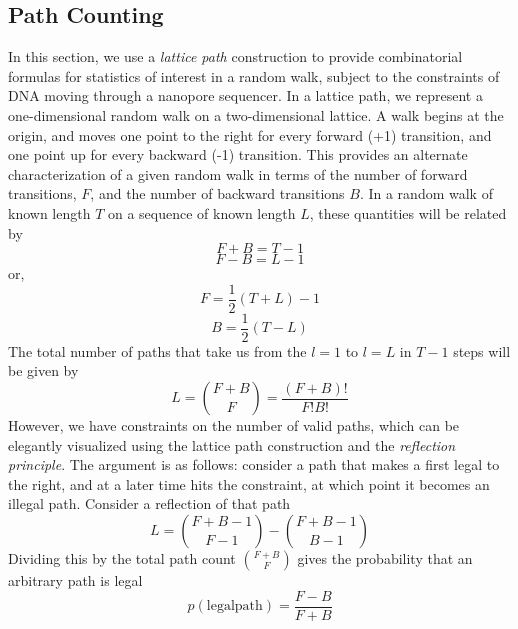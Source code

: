 \subsection{Path Counting}
In this section, we use a \emph{lattice path} construction to provide combinatorial formulas for statistics of interest in a random walk, subject to the constraints of DNA moving through a nanopore sequencer. In a lattice path, we represent a one-dimensional random walk on a two-dimensional lattice. A walk begins at the origin, and moves one point to the right for every forward (+1) transition, and one point up for every backward (-1) transition. This provides an alternate characterization of a given random walk in terms of the number of forward transitions, $F$, and the number of backward transitions $B$. In a random walk of known length $T$ on a sequence of known length $L$, these quantities will be related by
\begin{equation}
F+B = T-1
\end{equation}
\begin{equation}
F-B = L-1
\end{equation}
or,
\begin{equation}
F = \frac{1}{2}(T+L) - 1
\end{equation}
\begin{equation}
B = \frac{1}{2}(T-L)
\end{equation}
The total number of paths that take us from the $l=1$ to $l=L$ in $T-1$ steps will be given by
\begin{equation}
L = \binom{F+B}{F} = \frac{(F+B)!}{F!B!}
\end{equation}
However, we have constraints on the number of valid paths, which can be elegantly visualized using the lattice path construction and the \emph{reflection principle}. The argument is as follows: consider a path that makes a first legal to the right, and at a later time hits the constraint, at which point it becomes an illegal path. Consider a reflection of that path
\begin{equation}
L = \binom{F+B-1}{F-1} - \binom{F+B-1}{B-1}
\end{equation}
Dividing this by the total path count $\binom{F+B}{F}$ gives the probability that an arbitrary path is legal
\begin{equation}
p(\mathrm{legal path}) = \frac{F-B}{F+B}
\end{equation}



